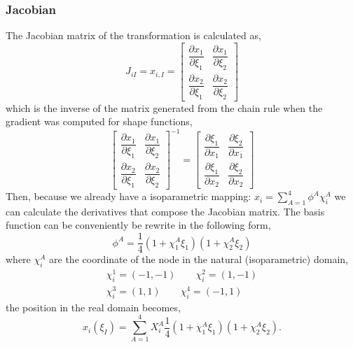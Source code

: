 \documentclass[11pt, a4paper]{article}
\numberwithin{equation}{section}
\begin{document}
\subsubsection{Jacobian}

The Jacobian matrix of the transformation is calculated as,
\begin{equation}
J_{iI} = x_{i,I} = \begin{bmatrix}
\dfrac{\partial x_1}{\partial \xi_1}  & \dfrac{\partial x_1}{\partial \xi_2} \\[0.4cm]
\dfrac{\partial x_2}{\partial \xi_1}  & \dfrac{\partial x_2}{\partial \xi_2} 
\end{bmatrix}
\end{equation}
which is the inverse of the matrix generated from the chain rule when the gradient was computed for shape functions,
\begin{equation}
\begin{bmatrix}
\dfrac{\partial x_1}{\partial \xi_1}  & \dfrac{\partial x_1}{\partial \xi_2} \\[0.4cm]
\dfrac{\partial x_2}{\partial \xi_1}  & \dfrac{\partial x_2}{\partial \xi_2} 
\end{bmatrix}^{-1}
=
\begin{bmatrix}
\dfrac{\partial \xi_1}{\partial x_1} & \dfrac{\partial \xi_2}{\partial x_1}\\[0.4cm]
\dfrac{\partial \xi_1}{\partial x_2} & \dfrac{\partial \xi_2}{\partial x_2}
\end{bmatrix}
\end{equation}
Then, because we already have a isoparametric mapping: $x_i=\sum_{A=1}^4 \phi^A \chi_i^A$ we can calculate the derivatives that compose the Jacobian matrix.
The basis function can be conveniently be rewrite in the following form,
\begin{equation}
\phi^A = \dfrac{1}{4} \left(1 + \chi^A_1 \xi_1\right)  \left(1 + \chi_2^A \xi_2\right) 
\end{equation}
where $\chi^A_i$ are the coordinate of the node in the natural (isoparametric) domain,
\begin{align*}
 \chi^1_i = (-1, -1) \qquad 
\chi^2_i = (1, -1) \\
\chi^3_i = (1, 1) \qquad \chi_i^4 = (-1, 1)
\end{align*}
the position in the real domain becomes,
\begin{equation}
x_i (\xi_I) =   \sum_{A=1}^4 X_i^A \dfrac{1}{4} \left(1 + \chi_1^A \xi_1\right) \left(1 + \chi_2^A \xi_2\right) .
\end{equation}
\end{document}
